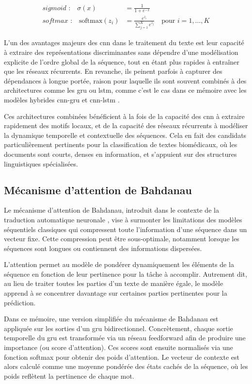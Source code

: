 \documentclass[12pt]{report}
\begin{document}
\begin{align}
\textit{sigmoid :} \quad \sigma(x) &= \frac{1}{1 + e^{-x}} \\[1em]
\textit{softmax :} \quad \text{softmax}(z_i) &= \frac{e^{z_i}}{\sum_{j=1}^{K} e^{z_j}} \quad \text{pour } i = 1, \dots, K
\end{align}

L’un des avantages majeurs des \gls{cnn} dans le traitement du texte est leur capacité à extraire des représentations discriminantes sans dépendre d’une modélisation explicite de l’ordre global de la séquence, tout en étant plus rapides à entraîner que les réseaux récurrents. En revanche, ils peinent parfois à capturer des dépendances à longue portée, raison pour laquelle ils sont souvent combinés à des architectures comme les \gls{gru} ou \gls{lstm}, comme c’est le cas dans ce mémoire avec les modèles hybrides \gls{cnn}-\gls{gru} et \gls{cnn}-\gls{lstm} \cite{zhou2015clstm}.

Ces architectures combinées bénéficient à la fois de la capacité des \gls{cnn} à extraire rapidement des motifs locaux, et de la capacité des réseaux récurrents à modéliser la dynamique temporelle et contextuelle des séquences. Cela en fait des candidats particulièrement pertinents pour la classification de textes biomédicaux, où les documents sont courts, denses en information, et s’appuient sur des structures linguistiques spécialisées.

\subsection{Mécanisme d’attention de Bahdanau}

Le mécanisme d'attention de Bahdanau, introduit dans le contexte de la traduction automatique neuronale \cite{bahdanau2015neural}, vise à surmonter les limitations des modèles séquentiels classiques qui compressent toute l’information d’une séquence dans un vecteur fixe. Cette compression peut être sous-optimale, notamment lorsque les séquences sont longues ou contiennent des informations dispersées.

L’attention permet au modèle de pondérer dynamiquement les éléments de la séquence en fonction de leur pertinence pour la tâche à accomplir. Autrement dit, au lieu de traiter toutes les parties d’un texte de manière égale, le modèle apprend à se concentrer davantage sur certaines parties pertinentes pour la prédiction.

Dans ce mémoire, une version simplifiée du mécanisme de Bahdanau est appliquée sur les sorties d’un \gls{gru} bidirectionnel. Concrètement, chaque sortie temporelle du \gls{gru} est transformée via un réseau feedforward afin de produire une importance (ou score d’attention). Ces scores sont ensuite normalisés via une fonction softmax pour obtenir des poids d’attention. Le vecteur de contexte est alors calculé comme une moyenne pondérée des états cachés de la séquence, où les poids reflètent la pertinence de chaque mot.
\end{document}
